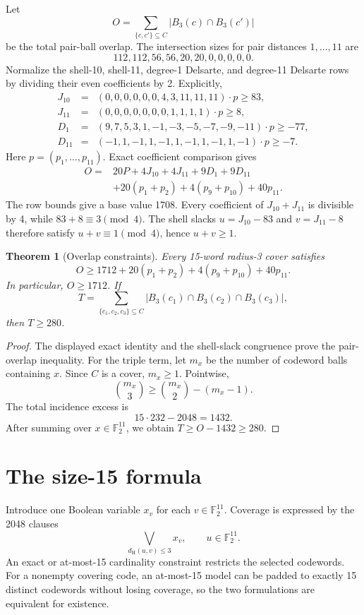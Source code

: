 \documentclass[11pt]{article}
\newtheorem{theorem}{Theorem}
\theoremstyle{definition}
\theoremstyle{remark}
\newcommand{\F}{\mathbb F}
\newcommand{\dist}{d_{\mathrm H}}
\begin{document}
Let
\[
  O=\sum_{\{c,c'\}\subseteq C}|B_3(c)\cap B_3(c')|
\]
be the total pair-ball overlap.  The intersection sizes for pair
distances $1,\ldots,11$ are
\[
  112,112,56,56,20,20,0,0,0,0,0.
\]
Normalize the shell-10, shell-11, degree-1 Delsarte, and degree-11
Delsarte rows by dividing their even coefficients by 2.  Explicitly,
\[
\begin{array}{rcl}
J_{10}&=&(0,0,0,0,0,0,4,3,11,11,11)\cdot p\geq83,\\
J_{11}&=&(0,0,0,0,0,0,0,1,1,1,1)\cdot p\geq8,\\
D_1&=&(9,7,5,3,1,-1,-3,-5,-7,-9,-11)\cdot p\geq-77,\\
D_{11}&=&(-1,1,-1,1,-1,1,-1,1,-1,1,-1)\cdot p\geq-7.
\end{array}
\]
Here $p=(p_1,\ldots,p_{11})$.  Exact coefficient comparison gives
\[
\begin{split}
  O={}&20P+4J_{10}+4J_{11}+9D_1+9D_{11}\\
     &+20(p_1+p_2)+4(p_9+p_{10})+40p_{11}.
\end{split}
\]
The row bounds give a base value 1708.  Every coefficient of
$J_{10}+J_{11}$ is divisible by 4, while $83+8\equiv3\pmod4$.
The shell slacks $u=J_{10}-83$ and $v=J_{11}-8$ therefore satisfy
$u+v\equiv1\pmod4$, hence $u+v\geq1$.

\begin{theorem}[Overlap constraints]
\label{thm:overlap}
Every 15-word radius-3 cover satisfies
\[
  O\geq1712+20(p_1+p_2)+4(p_9+p_{10})+40p_{11}.
\]
In particular, $O\geq1712$.  If
\[
  T=\sum_{\{c_1,c_2,c_3\}\subseteq C}
  |B_3(c_1)\cap B_3(c_2)\cap B_3(c_3)|,
\]
then $T\geq280$.
\end{theorem}

\begin{proof}
The displayed exact identity and the shell-slack congruence prove the
pair-overlap inequality.  For the triple term, let $m_x$ be the number
of codeword balls containing $x$.  Since $C$ is a cover, $m_x\geq1$.
Pointwise,
\[
  \binom{m_x}{3}\geq\binom{m_x}{2}-(m_x-1).
\]
The total incidence excess is
\[
  15\cdot232-2048=1432.
\]
After summing over $x\in\F_2^{11}$, we obtain
$T\geq O-1432\geq280$.
\end{proof}

\section{The size-15 formula}

Introduce one Boolean variable $x_v$ for each $v\in\F_2^{11}$.
Coverage is expressed by the 2048 clauses
\[
  \bigvee_{\dist(u,v)\leq3}x_v,
  \qquad u\in\F_2^{11}.
\]
An exact or at-most-15 cardinality constraint restricts the selected
codewords.  For a nonempty covering code, an at-most-15 model can be
padded to exactly 15 distinct codewords without losing coverage, so the
two formulations are equivalent for existence.
\end{document}
